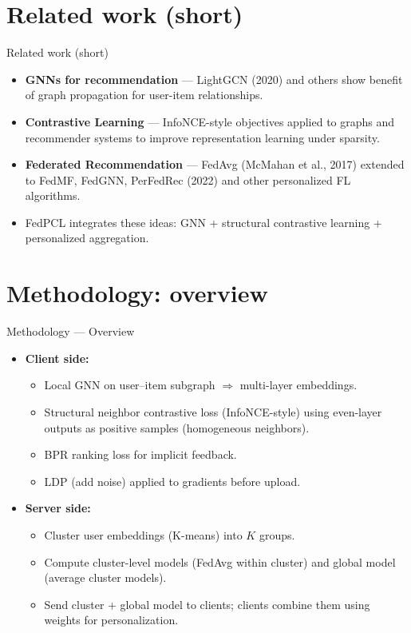 \documentclass{beamer}
\begin{document}
\section{Related work (short)}
\begin{frame}{Related work (short)}
  \begin{itemize}
    \item \textbf{GNNs for recommendation} — LightGCN (2020) and others show benefit of graph propagation for user-item relationships.
    \item \textbf{Contrastive Learning} — InfoNCE-style objectives applied to graphs and recommender systems to improve representation learning under sparsity.
    \item \textbf{Federated Recommendation} — FedAvg (McMahan et al., 2017) extended to FedMF, FedGNN, PerFedRec (2022) and other personalized FL algorithms.
    \item FedPCL integrates these ideas: GNN + structural contrastive learning + personalized aggregation.
  \end{itemize}
\end{frame}

\section{Methodology: overview}
\begin{frame}{Methodology — Overview}
  \begin{itemize}
    \item \textbf{Client side:}
      \begin{itemize}
        \item Local GNN on user--item subgraph $\Rightarrow$ multi-layer embeddings.
        \item Structural neighbor contrastive loss (InfoNCE-style) using even-layer outputs as positive samples (homogeneous neighbors).
        \item BPR ranking loss for implicit feedback.
        \item LDP (add noise) applied to gradients before upload.
      \end{itemize}
    \item \textbf{Server side:}
      \begin{itemize}
        \item Cluster user embeddings (K-means) into $K$ groups.
        \item Compute cluster-level models (FedAvg within cluster) and global model (average cluster models).
        \item Send cluster + global model to clients; clients combine them using weights for personalization.
      \end{itemize}
  \end{itemize}
\end{frame}
\end{document}
